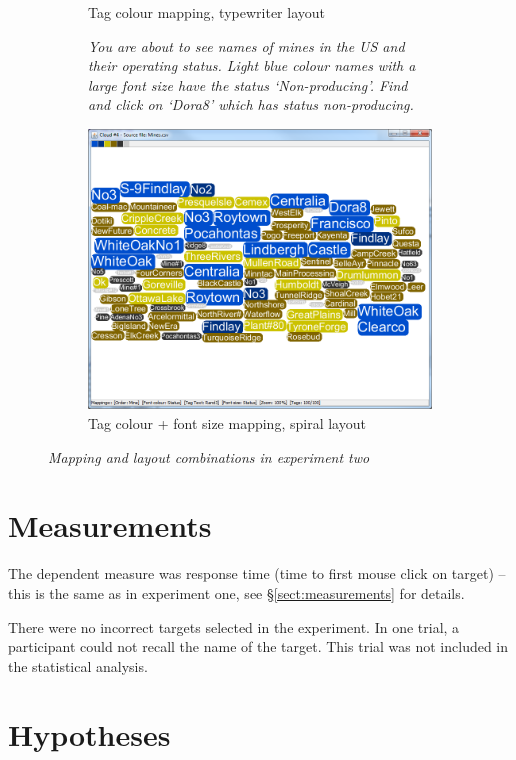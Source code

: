 \begin{figure}[!htb]
\begin{subfigure}{.7\textwidth}
  \caption{Tag colour mapping, typewriter layout}
\end{subfigure}
\begin{subfigure}{.3\textwidth}
  \centering
   \textit{You are about to see names of mines in the US and their operating status.
 		 Light blue colour names with a large font size have the status `Non-producing'. 
  		Find and click on `Dora8' which has status non-producing.}
\end{subfigure}%
\begin{subfigure}{.7\textwidth}
  \centering
  \includegraphics[scale=0.30]{M3Spiral.png}
  \caption{Tag colour + font size mapping, spiral layout}
\end{subfigure}
\caption{\textit{Mapping and layout combinations in experiment two}}
\label{fig:exp2}
\end{figure}

\section{Measurements}

The dependent measure was response time (time to first mouse click on target) -- this is the same as in experiment one, see \S\ref{sect:measurements} for details.

There were no incorrect targets selected in the experiment. In one trial, a participant could not recall the name of the target. This trial was not included in the statistical analysis.

\section{Hypotheses} \label{sect:exp2hypotheses}
 

